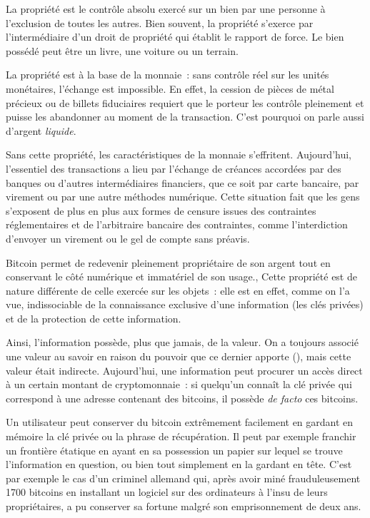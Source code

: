 La propriété est le contrôle absolu exercé sur un bien par une personne à l'exclusion de toutes les autres. Bien souvent, la propriété s'exerce par l'intermédiaire d'un droit de propriété qui établit  le rapport de force. Le bien possédé peut être un livre, une voiture ou un terrain. %

La propriété est à la base de la monnaie~: sans contrôle réel sur les unités monétaires, l'échange est impossible. En effet, la cession de pièces de métal précieux ou de billets fiduciaires requiert que le porteur les contrôle pleinement et puisse les abandonner au moment de la transaction. C'est pourquoi on parle aussi d'argent \emph{liquide}.

Sans cette propriété, les caractéristiques de la monnaie s'effritent. Aujourd'hui, l'essentiel des transactions a lieu par l'échange de créances accordées par des banques ou d'autres intermédiaires financiers, que ce soit par carte bancaire, par virement ou par une autre méthodes numérique. Cette situation fait que les gens s'exposent de plus en plus aux formes de censure issues des contraintes réglementaires et de l'arbitraire bancaire des contraintes, comme l'interdiction d'envoyer un virement ou le gel de compte sans préavis.

Bitcoin permet de redevenir pleinement propriétaire de son argent tout en conservant le côté numérique et immatériel de son usage., Cette propriété est de nature différente de celle exercée sur les objets~: elle est en effet, comme on l'a vue, indissociable de la connaissance exclusive d'une information (les clés privées) et de la protection de cette information. 

Ainsi, l'information possède, plus que jamais, de la valeur. On a toujours associé une valeur au savoir en raison du pouvoir que ce dernier apporte (), mais cette valeur était indirecte. Aujourd'hui, une information peut procurer un accès direct à un certain montant de cryptomonnaie~: si quelqu'un connaît la clé privée qui correspond à une adresse contenant des bitcoins, il possède \emph{de facto} ces bitcoins.

Un utilisateur peut conserver du bitcoin extrêmement facilement en gardant en mémoire la clé privée ou la phrase de récupération. Il peut par exemple franchir un frontière étatique en ayant en sa possession un papier sur lequel se trouve l'information en question, ou bien tout simplement en la gardant en tête. C'est par exemple le cas d'un criminel allemand qui, après avoir miné frauduleusement 1700 bitcoins en installant un logiciel sur des ordinateurs à l'insu de leurs propriétaires, a pu conserver sa fortune malgré son emprisonnement de deux ans.

